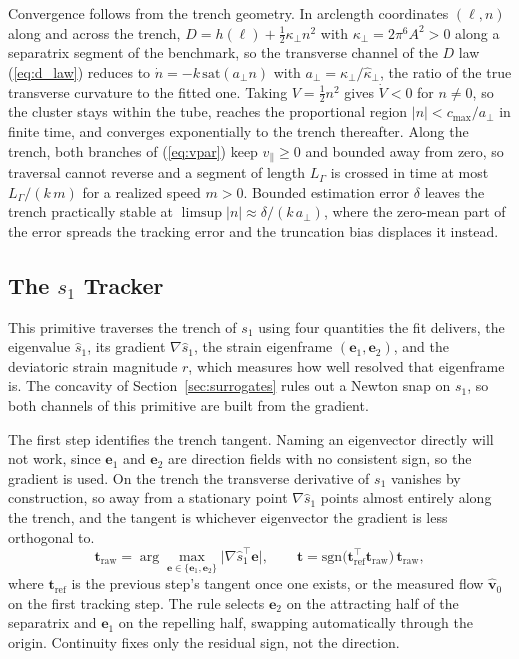 \documentclass[lettersize,journal]{IEEEtran}
\begin{document}
Convergence follows from the trench geometry. In arclength coordinates
$(\ell, n)$ along and across the trench, $D = h(\ell) +
\tfrac{1}{2}\kappa_\perp n^2$ with $\kappa_\perp = 2\pi^6 A^2 > 0$ along
a separatrix segment of the benchmark, so the transverse channel of the
$D$ law (\ref{eq:d_law}) reduces to $\dot{n} = -k\,\mathrm{sat}(a_\perp
n)$ with
$a_\perp = \kappa_\perp/\hat{\kappa}_\perp$, the ratio of the true
transverse curvature to the fitted one. Taking $V = \tfrac{1}{2}n^2$
gives $\dot{V} < 0$ for $n \neq 0$, so the cluster stays within the tube,
reaches the proportional region $|n| < c_{\max}/a_\perp$ in finite time,
and converges exponentially to the trench thereafter. Along the trench,
both branches of (\ref{eq:vpar}) keep $v_\parallel \geq 0$ and bounded
away from zero, so traversal cannot reverse and a segment
of length $L_\Gamma$ is crossed in time at most $L_\Gamma/(k\,m)$ for a
realized speed $m > 0$. Bounded estimation error $\delta$ leaves the
trench practically stable at $\limsup |n| \approx \delta/(k\,a_\perp)$,
where the zero-mean part of the error spreads the tracking error and the
truncation bias displaces it instead.

\subsection{The $s_1$ Tracker}

This primitive traverses the trench of $s_1$ using four quantities the
fit delivers, the eigenvalue $\hat{s}_1$, its gradient
$\nabla\hat{s}_1$, the strain eigenframe $(\mathbf{e}_1, \mathbf{e}_2)$,
and the deviatoric strain magnitude $r$, which measures how well resolved
that eigenframe is. The concavity of Section~\ref{sec:surrogates} rules
out a Newton snap on $s_1$, so both
channels of this primitive are built from the gradient.

The first step identifies the trench tangent. Naming an eigenvector
directly will not work, since $\mathbf{e}_1$ and $\mathbf{e}_2$ are
direction fields with no consistent sign, so the gradient is used. On the
trench the transverse derivative of $s_1$ vanishes by construction, so
away from a stationary point $\nabla\hat{s}_1$ points almost entirely
along the trench, and the tangent is whichever eigenvector the gradient
is less orthogonal to.
\begin{equation}
    \mathbf{t}_{\mathrm{raw}} =
    \arg\max_{\mathbf{e} \in \{\mathbf{e}_1, \mathbf{e}_2\}}
    \bigl\lvert \nabla\hat{s}_1^\top \mathbf{e} \bigr\rvert,
    \qquad
    \mathbf{t} = \mathrm{sgn}\bigl(\mathbf{t}_{\mathrm{ref}}^\top
    \mathbf{t}_{\mathrm{raw}}\bigr)\,\mathbf{t}_{\mathrm{raw}},
    \label{eq:tangent_select}
\end{equation}
where $\mathbf{t}_{\mathrm{ref}}$ is the previous step's tangent once one
exists, or the measured flow $\hat{\mathbf{v}}_0$ on the
first tracking step. The rule selects $\mathbf{e}_2$ on the attracting
half of the separatrix and $\mathbf{e}_1$ on the repelling half, swapping
automatically through the origin. Continuity fixes only the residual
sign, not the direction.
\end{document}
